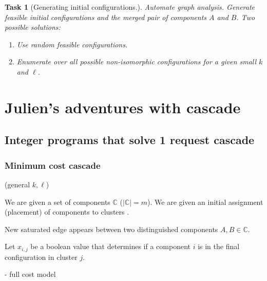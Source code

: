 \documentclass[a4paper,USenglish]{lipics-v2019}
\newtheorem{task}{Task}
\begin{document}
\begin{task}[Generating initial configurations.]

Automate graph analysis. Generate feasible initial configurations and the
merged pair of components $A$ and $B$. Two
possible solutions:
\begin{enumerate}
    \item Use
random feasible configurations.
\item Enumerate over all possible non-isomorphic configurations for a given small $k$
    and $\ell$.
\end{enumerate}
\end{task}


\section{Julien's adventures with cascade}

\subsection{Integer programs that solve 1 request cascade}

\subsubsection{Minimum cost cascade}

(general $k, \ell$)

We are given a set of components $\mathbb{C}$ ($|\mathbb{C}| = m$).
We are given an initial assignment (placement) of components to clusters .


New saturated edge appears between two distinguished components $A, B \in \mathbb{C}$.

Let $x_{i,j}$ be a boolean value that determines if a component $i$ is in the final configuration in cluster $j$.

- full cost model

  
  


\appendix
\end{document}

